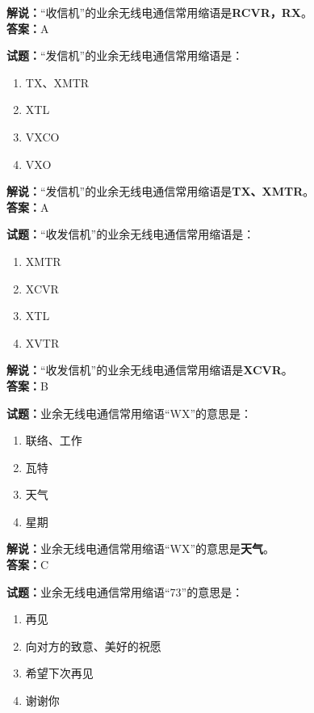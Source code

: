 \documentclass{ctexbook}
\begin{document}
\noindent\textbf{解说：}“收信机”的业余无线电通信常用缩语是\textbf{RCVR，RX}。\\\noindent\textbf{答案：}A


\bigskip


\noindent\textbf{试题：}“发信机”的业余无线电通信常用缩语是：

\begin{enumerate}[leftmargin=3em]
	\item TX、XMTR
	\item XTL
	\item VXCO
	\item VXO
\end{enumerate}

\noindent\textbf{解说：}“发信机”的业余无线电通信常用缩语是\textbf{TX、XMTR}。\\\noindent\textbf{答案：}A


\bigskip


\noindent\textbf{试题：}“收发信机”的业余无线电通信常用缩语是：

\begin{enumerate}[leftmargin=3em]
	\item XMTR
	\item XCVR
	\item XTL
	\item XVTR
\end{enumerate}

\noindent\textbf{解说：}“收发信机”的业余无线电通信常用缩语是\textbf{XCVR}。\\\noindent\textbf{答案：}B


\bigskip


\noindent\textbf{试题：}业余无线电通信常用缩语“WX”的意思是：

\begin{enumerate}[leftmargin=3em]
	\item 联络、工作
	\item 瓦特
	\item 天气
	\item 星期
\end{enumerate}

\noindent\textbf{解说：}业余无线电通信常用缩语“WX”的意思是\textbf{天气}。\\\noindent\textbf{答案：}C


\bigskip


\noindent\textbf{试题：}业余无线电通信常用缩语“73”的意思是：

\begin{enumerate}[leftmargin=3em]
	\item 再见
	\item 向对方的致意、美好的祝愿
	\item 希望下次再见
	\item 谢谢你
\end{enumerate}
\end{document}
